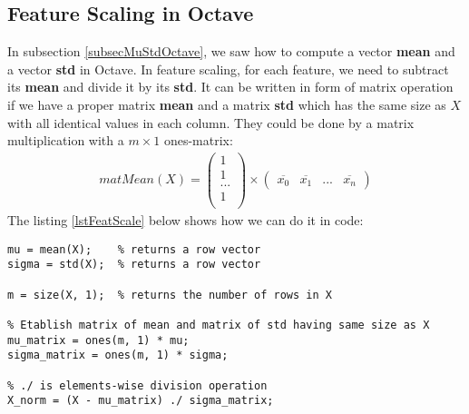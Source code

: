 \subsection{Feature Scaling in Octave}
In subsection \ref{subsecMuStdOctave}, we saw how to compute a vector \textbf{mean} and a vector \textbf{std} in Octave. In feature scaling, for each feature, we need to subtract its \textbf{mean} and divide it by its \textbf{std}. It can be written in form of matrix operation if we have a proper matrix \textbf{mean} and a matrix \textbf{std} which has the same size as $X$ with all identical values in each column. They could be done by a matrix multiplication with a $m \times 1$ ones-matrix:
\begin{align}
matMean(X) = \begin{pmatrix}
1 \\
1 \\
... \\
1 \\
\end{pmatrix} \times \begin{pmatrix}
\overline{x_0} & \overline{x_1} & ... & \overline{x_n}
\end{pmatrix}
\end{align}
The listing \ref{lstFeatScale} below shows how we can do it in code:
\begin{lstlisting}[label=lstFeatScale, caption=Feature Scaling in Octave]
mu = mean(X);    % returns a row vector
sigma = std(X);  % returns a row vector

m = size(X, 1);  % returns the number of rows in X

% Etablish matrix of mean and matrix of std having same size as X
mu_matrix = ones(m, 1) * mu;
sigma_matrix = ones(m, 1) * sigma;

% ./ is elements-wise division operation
X_norm = (X - mu_matrix) ./ sigma_matrix;
\end{lstlisting}